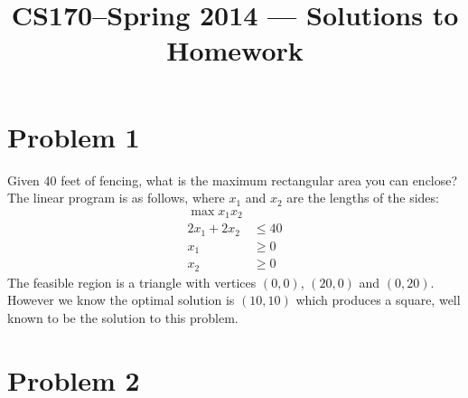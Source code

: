 \documentclass[11pt]{article}
\title{CS170--Spring 2014 --- Solutions to Homework \Homework}
\author{\Name}
\begin{document}
\maketitle
{}
\setcounter{problemnumber}{0}

\section*{Problem 1}
Given 40 feet of fencing, what is the maximum rectangular area you can enclose? The linear program is as follows, where $x_1$ and $x_2$ are the lengths of the sides:
\begin{align*}
\max{x_1x_2} \\
2x_1+2x_2 &\leq 40 \\
x_1 &\geq 0 \\
x_2 &\geq 0
\end{align*}
The feasible region is a triangle with vertices $(0,0)$, $(20,0)$ and $(0,20)$. However we know the optimal solution is $(10,10)$ which produces a square, well known to be the solution to this problem.


\newpage
\section*{Problem 2}


\newpage
\end{document}
